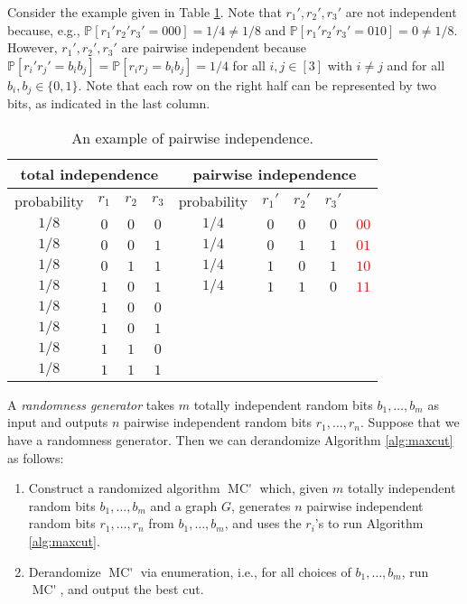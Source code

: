\documentclass[letterpaper, reqno,11pt]{article}
\newcommand{\PP}{\mathbb{P}}
\DeclareMathOperator{\MCprime}{MC'}
\begin{document}
Consider the example given in Table \ref{tab:pairwise-ind}. Note that $r_1', r_2', r_3'$ are not independent because, e.g., $\PP[r_1'r_2'r_3' = 000] = 1/4 \neq 1/8$ and $\PP[r_1'r_2'r_3'=010] = 0 \neq 1/8$. However, $r_1', r_2', r_3'$ are pairwise independent because $\PP[r_i' r_j' = b_i b_j] = \PP[r_i r_j = b_i b_j] = 1/4$ for all $i, j \in [3]$ with $i \neq j$ and for all $b_i, b_j \in \{ 0, 1 \}$. Note that each row on the right half can be represented by two bits, as indicated in the last column.

\begin{table}[h]
  \centering
  \begin{tabular}{cccc|ccccc}
    \multicolumn{4}{c|}{total independence} & \multicolumn{5}{c}{pairwise independence} \\
    \hline
    probability & $r_1$ & $r_2$ & $r_3$ & probability & $r_1'$ & $r_2'$ & $r_3'$ \\
    $1/8$ & $0$ & $0$ & $0$ & $1/4$ & $0$ & $0$ & $0$ & \textcolor{red}{$00$} \\
    $1/8$ & $0$ & $0$ & $1$ & $1/4$ & $0$ & $1$ & $1$ & \textcolor{red}{$01$} \\
    $1/8$ & $0$ & $1$ & $1$ & $1/4$ & $1$ & $0$ & $1$ & \textcolor{red}{$10$} \\
    $1/8$ & $1$ & $0$ & $1$ & $1/4$ & $1$ & $1$ & $0$ & \textcolor{red}{$11$} \\
    $1/8$ & $1$ & $0$ & $0$ \\
    $1/8$ & $1$ & $0$ & $1$ \\
    $1/8$ & $1$ & $1$ & $0$ \\
    $1/8$ & $1$ & $1$ & $1$ \\
  \end{tabular}
  \caption{An example of pairwise independence.}
  \label{tab:pairwise-ind}
\end{table}

A \emph{randomness generator} takes $m$ totally independent random bits $b_1, \ldots, b_m$ as input and outputs $n$ pairwise independent random bits $r_1, \ldots, r_n$. Suppose that we have a randomness generator. Then we can derandomize Algorithm \ref{alg:maxcut} as follows:
\begin{enumerate}[label=(\roman*), itemsep=0pt]
  \item Construct a randomized algorithm $\MCprime$ which, given $m$ totally independent random bits $b_1, \ldots, b_m$ and a graph $G$, generates $n$ pairwise independent random bits $r_1, \ldots, r_n$ from $b_1, \ldots, b_m$, and uses the $r_i$'s to run Algorithm \ref{alg:maxcut}.
  \item Derandomize $\MCprime$ via enumeration, i.e., for all choices of $b_1, \ldots, b_m$, run $\MCprime$, and output the best cut.
\end{enumerate}
\end{document}
